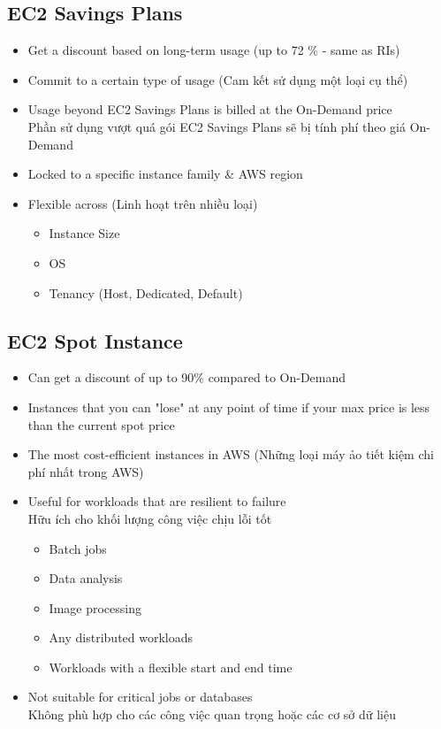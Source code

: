\subsection{EC2 Savings Plans}

\begin{itemize}
	\item Get a discount based on long-term usage (up to 72 \% - same as RIs)
	\item Commit to a certain type of usage (Cam kết sử dụng một loại cụ thể)
	\item Usage beyond EC2 Savings Plans is billed at the On-Demand price \\ Phần sử dụng vượt quá gói EC2 Savings Plans sẽ bị tính phí theo giá On-Demand
	\item Locked to a specific instance family \& AWS region
	\item Flexible across (Linh hoạt trên nhiều loại)
	\begin{itemize}
		\item Instance Size 
		\item OS
		\item Tenancy (Host, Dedicated, Default)
	\end{itemize}
\end{itemize}

\subsection{EC2 Spot Instance}

\begin{itemize}
	\item Can get a discount of up to 90\% compared to On-Demand
	\item Instances that you can "lose" at any point of time if your max price is less than the current spot price
	\item The most cost-efficient instances in AWS (Những loại máy ảo tiết kiệm chi phí nhất trong AWS)
	
	\item Useful for workloads that are resilient to failure \\ Hữu ích cho khối lượng công việc chịu lỗi tốt
	\begin{itemize}
		\item Batch jobs
		\item Data analysis
		\item Image processing
		\item Any distributed workloads
		\item Workloads with a flexible start and end time
	\end{itemize}
	\item Not suitable for critical jobs or databases \\ Không phù hợp cho các công việc quan trọng hoặc các cơ sở dữ liệu
\end{itemize}

